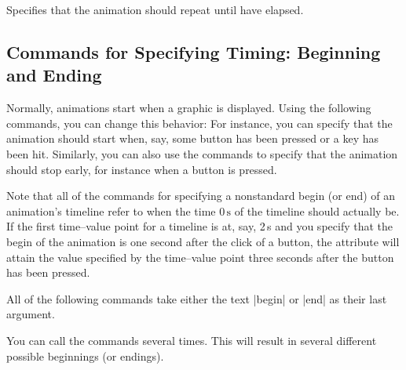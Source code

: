 \begin{command}{\pgfsysanimkeyrepeatdur{}}
\end{command}
\begin{command}{\pgfsys@animation@repeat@dur{}}
    Specifies that the animation should repeat until  have
    elapsed.
\begin{codeexample}[
    width=6cm,
    preamble={\usetikzlibrary{animations}},
    animation list={1,2,3,4,5,6,7,8},
]
\end{codeexample}
\end{command}


\subsection{Commands for Specifying Timing: Beginning and Ending}

Normally, animations start when a graphic is displayed. Using the following
commands, you can change this behavior: For instance, you can specify that the
animation should start when, say, some button has been pressed or a key has
been hit. Similarly, you can also use the commands to specify that the
animation should stop early, for instance when a button is pressed.

Note that all of the commands for specifying a nonstandard begin (or end) of an
animation's timeline refer to when the time $0\,\mathrm s$ of the timeline
should actually be. If the first time--value point for a timeline is at, say,
2\,s and you specify that the begin of the animation is one second after the
click of a button, the attribute will attain the value specified by the
time--value point three seconds after the button has been pressed.

All of the following commands take either the text |begin| or |end| as their
last argument.

You can call the commands several times. This will result in several different
possible beginnings (or endings).

